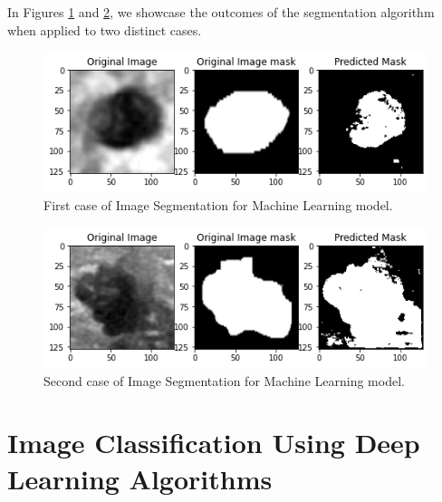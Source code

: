 In Figures \ref{Figure - ML_Segmentation First case of Image Segmentation} and \ref{Figure - ML_Segmentation Second case of Image Segmentation}, we showcase the outcomes of the segmentation algorithm when applied to two distinct cases.
	\begin{figure}
  		\includegraphics[width=\linewidth]{Figures/segment_ml_1.png}  		  				
  		\caption{First case of Image Segmentation for Machine Learning model.}
		\label{Figure - ML_Segmentation First case of Image Segmentation}
  	\end{figure}
  	\begin{figure}
  		\includegraphics[width=\linewidth]{Figures/segment_ml_2.png}  		  				
  		\caption{Second case of Image Segmentation for Machine Learning model.}
		\label{Figure - ML_Segmentation Second case of Image Segmentation}
  	\end{figure}


\section{Image Classification Using Deep Learning Algorithms}

